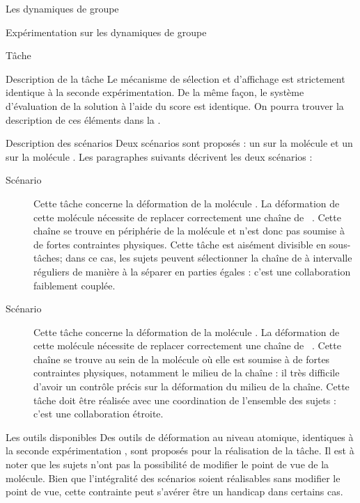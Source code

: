 \documentclass[myfrancais]{mythesis}
\begin{document}
\begin{mychapter}{Les dynamiques de groupe}
\begin{mysection}{Expérimentation sur les dynamiques de groupe}
\begin{mysubsection}{Tâche}
\begin{mysubsubsection}{Description de la tâche}
					Le mécanisme de sélection et d'affichage est strictement identique à la seconde expérimentation.
					De la même façon, le système d'évaluation de la solution à l'aide du score  est identique.
					On pourra trouver la description de ces éléments dans la .
				\end{mysubsubsection}
				\begin{mysubsubsection}{Description des scénarios}
					Deux scénarios sont proposés : un sur la molécule \myPrion et un sur la molécule \myUbiquitin.
					Les paragraphes suivants décrivent les deux scénarios :
					\begin{description}
						\item[Scénario~]
							Cette tâche concerne la déformation de la molécule \myPrion.
							La déformation de cette molécule nécessite de replacer correctement une chaîne de ~.
							Cette chaîne se trouve en périphérie de la molécule et n'est donc pas soumise à de fortes contraintes physiques.
							Cette tâche est aisément divisible en sous-tâches; dans ce cas, les sujets peuvent sélectionner la chaîne de  à intervalle réguliers de manière à la séparer en parties égales : c'est une collaboration faiblement couplée.
						\item[Scénario~]
							Cette tâche concerne la déformation de la molécule \myUbiquitin.
							La déformation de cette molécule nécessite de replacer correctement une chaîne de ~.
							Cette chaîne se trouve au sein de la molécule où elle est soumise à de fortes contraintes physiques, notamment le milieu de la chaîne : il très difficile d'avoir un contrôle précis sur la déformation du milieu de la chaîne.
							Cette tâche doit être réalisée avec une coordination de l'ensemble des sujets : c'est une collaboration étroite.
					\end{description}
				\end{mysubsubsection}
				\begin{mysubsubsection}{Les outils disponibles}
					Des outils de déformation au niveau atomique, identiques à la seconde expérimentation , sont proposés pour la réalisation de la tâche.
					Il est à noter que les sujets n'ont pas la possibilité de modifier le point de vue de la molécule.
					Bien que l'intégralité des scénarios soient réalisables sans modifier le point de vue, cette contrainte peut s'avérer être un handicap dans certains cas.

\end{mysubsubsection}
\end{mysubsection}
\end{mysection}
\end{mychapter}
\end{document}

